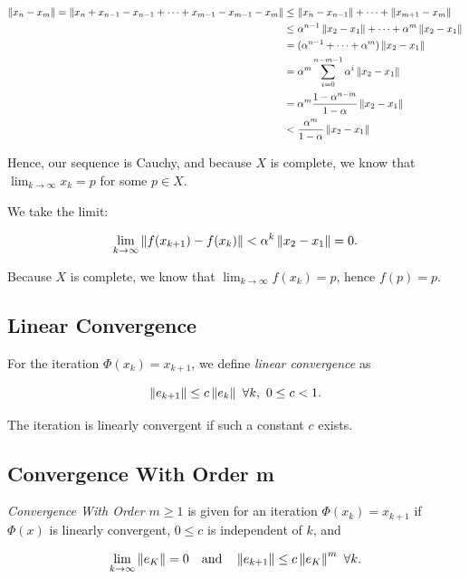 \begin{align*}
   \left\| x_n - x_m \right\| = \left\| x_n + x_{n - 1} - x_{n - 1} + \dots + x_{m - 1} - x_{m - 1} - x_m \right\| &\le \left\| x_n - x_{n - 1} \right\| + \dots + \left\| x_{m + 1} - x_m \right\| \\
    &\le \alpha^{n - 1} \left\| x_2 - x_1 \right\| + \dots + \alpha^m \left\| x_2 - x_1 \right\| \\
    &= (\alpha^{n - 1} + \dots + \alpha^m) \left\| x_2 - x_1 \right\| \\
    &= \alpha^m \sum_{i = 0}^{n - m - 1} \alpha^i \left\| x_2 - x_1 \right\| \\
    &= \alpha^m \frac{1 - \alpha^{n - m}}{1 - \alpha} \left\| x_2 - x_1 \right\| \\ 
    &< \frac{\alpha^m}{1 - \alpha} \left\| x_2 - x_1 \right\|
\end{align*}

Hence, our sequence is Cauchy, and because \(X\) is complete, we know that \(\lim_{k \to \infty} x_k = p\) for some \(p \in X\).

We take the limit:

\[
    \lim_{k \to \infty} \left\| f(x_{k + 1}) - f(x_{k}) \right\| < \alpha^k \left\| x_2 - x_1 \right\| = 0.
\]

Because \(X\) is complete, we know that \(\lim_{k \to \infty} f(x_k) = p\), hence \(f(p) = p\).

\QED

\subsection{Linear Convergence}

For the iteration \(\Phi(x_k) = x_{k + 1}\), we define \emph{linear convergence} as 

\[
    \metric{e_{k + 1}} \le c \metric{e_k} \ \forall k, \ 0 \le c < 1.
\]

The iteration is linearly convergent if such a constant \(c\) exists.

\subsection{Convergence With Order \texorpdfstring{m}{}}

\emph{Convergence With Order \(m \ge 1\)} is given for an iteration \(\Phi(x_k) = x_{k + 1}\) if \(\Phi(x)\) is 
linearly convergent, \(0 \le c\) is independent of \(k\), and 

\[
    \lim_{k \to \infty} \left\| e_K \right\| = 0 \quad \text{and} \quad \left\| e_{k + 1} \right\| \le c \left\| e_K \right\|^m \ \forall k.
\]

